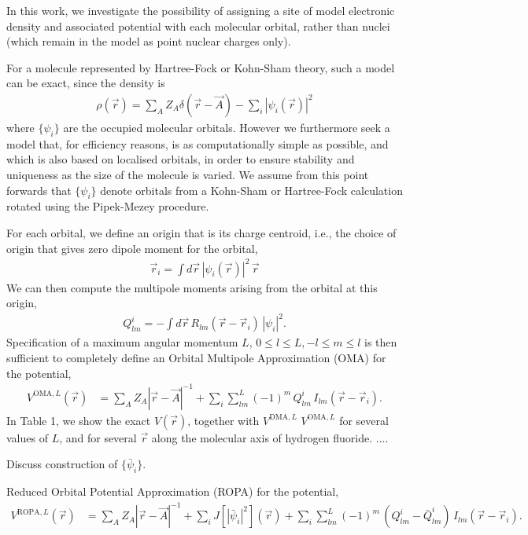 \documentclass[journal=jacsat,manuscript=article]{achemso}
\begin{document}
In this work, we investigate the possibility of assigning a site of model electronic density and associated potential with each molecular orbital, rather than nuclei (which remain in the model as point nuclear charges only).

For a molecule represented by Hartree-Fock or Kohn-Sham theory, such a model can be exact, since the density is
\begin{align}
    \rho(\vec r) = \sum_A Z_A \delta(\vec r - \vec A)
    -\sum_i |\psi_i(\vec r)|^2
\end{align}
where $\{\psi_i\}$ are the occupied molecular orbitals.
However we furthermore seek a model that, for efficiency reasons, is as computationally
simple as possible, and which is also based on localised orbitals, in order
to ensure stability and uniqueness as the size of the molecule is varied. We assume
from this point forwards that $\{\psi_i\}$ denote orbitals from a Kohn-Sham
or Hartree-Fock calculation rotated using the Pipek-Mezey procedure\cite{Pipek1989a}.

For each orbital, we define an origin that is its charge centroid, i.e., the
choice of origin that gives zero dipole moment for the orbital,
\begin{align}
  \vec r_i = \int d \vec r \,|\psi_i(\vec r)|^2 \,  \vec r
\end{align}
We can then compute the multipole moments arising from the orbital at this origin,
\begin{align}
    Q^i_{lm} = -\int d\vec r \, R_{lm}(\vec r-\vec r_i) \, |\psi_i|^2
    .
\end{align}
Specification of a maximum angular momentum $L$, $0\le l\le L, -l\le m\le l$ is then sufficient to completely define an Orbital Multipole Approximation (OMA) for the potential,
\begin{align}
    V^{\text{OMA},L}(\vec r) &=
    \sum_A Z_A |\vec r
    - \vec A|^{-1}
    +\sum_i \sum_{lm}^L(-1)^m\, Q^i_{lm}\, I_{lm}(\vec r - \vec r_i)
    .
\end{align}
In Table 1, we show the exact $V(\vec r)$, together with
$V^{\text{DMA},L}$
$V^{\text{OMA},L}$ for several values of $L$, and for several $\vec r$ along the molecular axis of hydrogen fluoride. $\dots$.

Discuss construction of $\{\bar\psi_i\}$.

Reduced Orbital Potential Approximation (ROPA) for the potential,
\begin{align}
    V^{\text{ROPA},L}(\vec r) &=
    \sum_A Z_A |\vec r
    - \vec A|^{-1}
    +\sum_i J\left[\left|\bar\psi_i\right|^2\right](\vec r)
    +\sum_i \sum_{lm}^L (-1)^m\,\left(Q^i_{lm}-\bar Q^i_{lm}\right)\, I_{lm}(\vec r - \vec r_i)
    .
\end{align}
\end{document}
